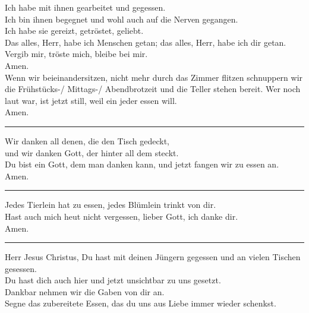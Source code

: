 Ich habe mit ihnen gearbeitet und gegessen. \\
Ich bin ihnen begegnet und wohl auch auf die Nerven gegangen.\\
Ich habe sie gereizt, getröstet, geliebt. \\
Das alles, Herr, habe ich Menschen getan; das alles, Herr, habe ich dir getan. \\
Vergib mir, tröste mich, bleibe bei mir.\\ \newline
Amen.\\
Wenn  wir  beieinandersitzen,  nicht  mehr  durch  das  Zimmer  flitzen  schnuppern  wir  die Frühstücks-/ Mittags-/ Abendbrotzeit und die Teller stehen bereit. Wer noch laut war, ist jetzt still, weil ein jeder essen will.\\ \newline
Amen.\\
\par\noindent\rule{\textwidth}{0.4pt} \newline \newline
Wir danken all denen, die den Tisch gedeckt, \\
und wir danken Gott, der hinter all dem steckt.\\
Du bist ein Gott, dem man danken kann, und jetzt fangen wir zu essen an.\\ \newline
Amen.\\
\par\noindent\rule{\textwidth}{0.4pt} \newline \newline
Jedes Tierlein hat zu essen, jedes Blümlein trinkt von dir.\\
 Hast auch mich heut nicht vergessen, lieber Gott, ich danke dir.\\ \newline
Amen.\\
\par\noindent\rule{\textwidth}{0.4pt} \newline \newline
Herr Jesus Christus, Du hast mit deinen Jüngern gegessen und an vielen Tischen gesessen. \\
Du hast dich auch hier und jetzt unsichtbar zu uns gesetzt.\\
Dankbar nehmen wir die Gaben von dir an.\\
Segne das zubereitete Essen, das du uns aus Liebe immer wieder schenkst.\\
